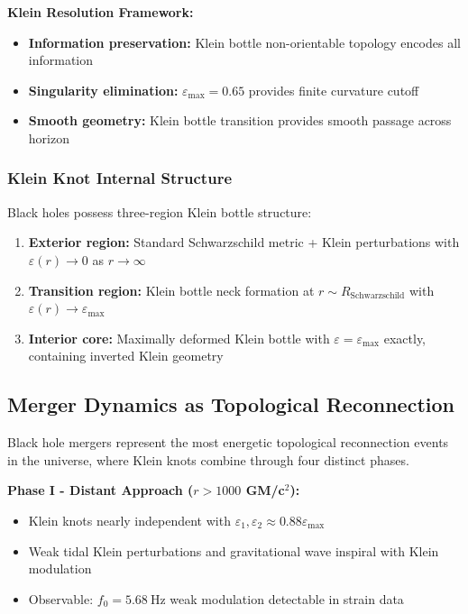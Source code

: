 \documentclass[12pt]{iopart}
\newcommand{\epsmax}{\varepsilon_{\text{max}}}
\newcommand{\fzero}{f_0}
\begin{document}
\textbf{Klein Resolution Framework:}
\begin{itemize}
\item \textbf{Information preservation:} Klein bottle non-orientable topology encodes all information
\item \textbf{Singularity elimination:} $\epsmax = 0.65$ provides finite curvature cutoff  
\item \textbf{Smooth geometry:} Klein bottle transition provides smooth passage across horizon
\end{itemize}

\subsubsection{Klein Knot Internal Structure}

Black holes possess three-region Klein bottle structure:
\begin{enumerate}
\item \textbf{Exterior region:} Standard Schwarzschild metric + Klein perturbations with $\varepsilon(r) \to 0$ as $r \to \infty$
\item \textbf{Transition region:} Klein bottle neck formation at $r \sim R_{\text{Schwarzschild}}$ with $\varepsilon(r) \to \epsmax$  
\item \textbf{Interior core:} Maximally deformed Klein bottle with $\varepsilon = \epsmax$ exactly, containing inverted Klein geometry
\end{enumerate}

\subsection{Merger Dynamics as Topological Reconnection}

Black hole mergers represent the most energetic topological reconnection events in the universe, where Klein knots combine through four distinct phases.

\textbf{Phase I - Distant Approach ($r > 1000$ GM/c$^2$):}
\begin{itemize}
\item Klein knots nearly independent with $\varepsilon_1, \varepsilon_2 \approx 0.88 \epsmax$
\item Weak tidal Klein perturbations and gravitational wave inspiral with Klein modulation
\item Observable: $\fzero = \SI{5.68}{\hertz}$ weak modulation detectable in strain data
\end{itemize}
\end{document}
